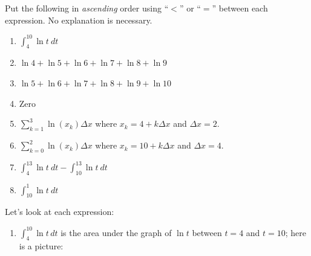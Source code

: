 \documentclass{article}
\begin{document}
\begin{enumerate}
\begin{problem}[\vfill]
Put the following in {\it ascending} order using ``$<$'' or ``$=$'' between each expression.  No explanation is necessary.
    \begin{enumerate}[label=\Alph*.]

    \item $\displaystyle\int_4^{10} \ln t \ dt$

    \item $\displaystyle \ln 4 + \ln 5 + \ln 6 + \ln 7 + \ln 8 + \ln 9$

    \item $\displaystyle \ln 5 + \ln 6 + \ln 7 + \ln 8 + \ln 9 + \ln 10$

    \item Zero

    \item $\displaystyle \sum_{k=1}^3 \ln (x_k) \Delta x$ where $x_k = 4 +
      k \Delta x$ and $\Delta x = 2$.

    \item $\displaystyle \sum_{k=0}^2 \ln (x_k) \Delta x$ where $x_k = 10 +
      k \Delta x$ and $\Delta x = 4$.

    \item $\displaystyle\int_4^{13} \ln t \ dt - \displaystyle\int_{10}^{13} \ln t \ dt$

    \item $\displaystyle\int_{10}^{1} \ln t \ dt$
    \end{enumerate}    
  \end{problem}

  \pspace{\newpage}

  \begin{solution} 
    Let's look at each expression:
    \begin{enumerate}[label=\Alph*.]

    \item $\displaystyle\int_4^{10} \ln t \, dt$ is the area under the
      graph of $\ln t$ between $t = 4$ and $t = 10$; here is a picture:
      \begin{center}
      \end{center}


\end{enumerate}
\end{solution}
\end{enumerate}
\end{document}
